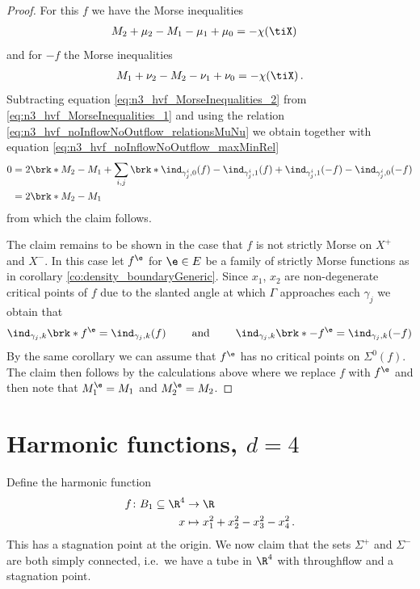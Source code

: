 \begin{proof}
  For this $f$ we have the Morse inequalities
  \begin{align}
    M_2+\mu_2-M_1-\mu_1+\mu_0&=-\chi(\tiX) \label{eq:n3_hvf_MorseInequalities_1}
  \end{align}
  and for $-f$ the Morse inequalities
  \begin{align}
    M_1+\nu_2-M_2-\nu_1+\nu_0=-\chi(\tiX) \label{eq:n3_hvf_MorseInequalities_2}\,.
  \end{align}
  Subtracting equation \eqref{eq:n3_hvf_MorseInequalities_2} from \eqref{eq:n3_hvf_MorseInequalities_1} and using the relation
  \eqref{eq:n3_hvf_noInflowNoOutflow_relationsMuNu} we obtain
  together with equation \eqref{eq:n3_hvf_noInflowNoOutflow_maxMinRel}
  \begin{align*}
    0&=2\brk*{M_2-M_1}
    +\sum_{i,j}\brk*{\ind_{\gamma_j^i,0}(f)
    -\ind_{\gamma_j^i,1}(f)
    +\ind_{\gamma_j^i,1}(-f)
    -\ind_{\gamma_j^i,0}(-f)} \\
    &=2\brk*{M_2-M_1}
  \end{align*}
  from which the claim follows.

  The claim remains to be shown in the case that $f$ is not strictly Morse on $X^+$ and $X^-$. In this case let
  $f^\e$ for $\e\in E$ be a family of strictly Morse functions as in corollary \ref{co:density_boundaryGeneric}.
  Since $x_1$, $x_2$ are non-degenerate critical points of $f$
  due to the slanted angle at which
  $\Gamma$ approaches each $\gamma_j$
  we obtain that
  \begin{align}
    \ind_{\gamma_j,k}\brk*{f^\e}=\ind_{\gamma_j,k}(f)\qquad\text{ and }\qquad 
    \ind_{\gamma_j,k}\brk*{-f^\e}=\ind_{\gamma_j,k}(-f)
    \label{eq:n3_hvf_noInflowNoOutflow_morse_indexApprox}
  \end{align}
  By the same corollary we can assume that $f^\e$ has no critical points on
  $\Sigma^0(f)$.
  The claim then follows by the calculations above where we replace
  $f$ with $f^\e$ and then note that $M_1^\e=M_1$ and $M_2^\e=M_2$.
\end{proof}

\chapter{Harmonic functions, $d=4$} 
Define the harmonic function 
\begin{align*}
  f\colon B_1\subseteq\R^4&\to \R \\
  x &\mapsto x_1^2+x_2^2-x_3^2-x_4^2\,.
\end{align*}
This has a stagnation point at the origin. We now claim that the sets $\Sigma^+$ and $\Sigma^-$ are both simply connected, i.e.\
we have a tube in $\R^4$ with throughflow and a stagnation point.

